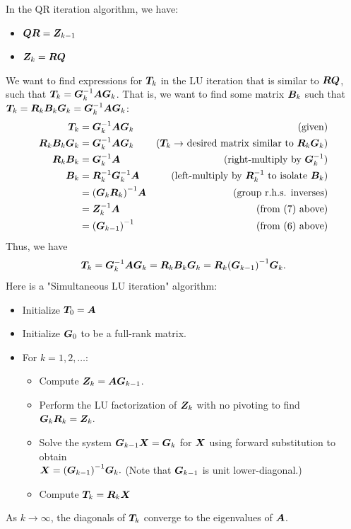 \documentclass[twoside,10pt]{article}
\begin{document}
In the QR iteration algorithm, we have:
\begin{itemize}
  \item $\bm{Q}\bm{R} = \bm{Z}_{k-1}$
  \item $\bm{Z}_{k} = \bm{R}\bm{Q}$
\end{itemize}
We want to find expressions for $\bm{T}_{k}$ in the LU iteration that is similar to $\bm{R}\bm{Q}$, such that $\bm{T}_k = \bm{G}_k^{-1}\bm{A}\bm{G}_k$.
That is, we want to find some matrix $\bm{B}_k$ such that $\bm{T}_{k} = \bm{R}_{k}\bm{B}_k\bm{G}_k = \bm{G}_{k}^{-1}\bm{A}\bm{G}_{k}$:
\begin{align*}
  \mtx{T}_k &= \mtx{G}_k^{-1}\mtx{A}\mtx{G}_k&\text{(given)}\\
  \mtx{R}_k\mtx{B}_k\mtx{G}_k &= \mtx{G}_k^{-1}\mtx{A}\mtx{G}_k&\text{($\mtx{T}_k \rightarrow$ desired matrix similar to $\mtx{R}_k\mtx{G}_k$)}\\
  \mtx{R}_k\mtx{B}_k &= \mtx{G}_k^{-1}\mtx{A}&\text{(right-multiply by $\mtx{G}_k^{-1}$)}\\
  \mtx{B}_k &= \mtx{R}_k^{-1}\mtx{G}_k^{-1}\mtx{A}&\text{(left-multiply by $\mtx{R}_k^{-1}$ to isolate $\mtx{B}_k$)}\\
  &= \left(\mtx{G}_k\mtx{R}_k\right)^{-1}\mtx{A}&\text{(group r.h.s. inverses)}\\
  &= \mtx{Z}_k^{-1}\mtx{A}&\text{(from (7) above)}\\
  &= \left(\mtx{G}_{k-1}\right)^{-1}&\text{(from (6) above)}
\end{align*}
Thus, we have
$$\mtx{T}_{k} = \mtx{G}_{k}^{-1}\mtx{A}\mtx{G}_{k} = \mtx{R}_{k}\mtx{B}_k\mtx{G}_k = \mtx{R}_{k}\left(\mtx{G}_{k-1}\right)^{-1}\mtx{G}_k.$$
Here is a "Simultaneous LU iteration" algorithm:
\begin{itemize}
  \item Initialize $\bm{T}_0 = \bm{A}$
  \item Initialize $\bm{G}_0$ to be a full-rank matrix.
  \item For $k = 1, 2, \ldots$:
  \begin{itemize}
    \item Compute $\bm{Z}_k = \bm{A}\bm{G}_{k-1}$.
    \item Perform the LU factorization of $\bm{Z}_k$ with no pivoting to find\\
    $\bm{G}_k\bm{R}_k = \bm{Z}_k.$
    \item Solve the system $\bm{G}_{k-1}\bm{X} = \bm{G}_k$ for $\bm{X}$ using forward substitution to obtain\\
    $\mtx{X} = \left(\mtx{G}_{k-1}\right)^{-1}\mtx{G}_k.$
    (Note that $\bm{G}_{k-1}$ is unit lower-diagonal.)
    \item Compute $\bm{T}_k = \bm{R}_k\bm{X}$
  \end{itemize}
\end{itemize}
As $k \rightarrow \infty$, the diagonals of $\bm{T}_k$ converge to the eigenvalues of $\bm{A}$.
\end{document}
